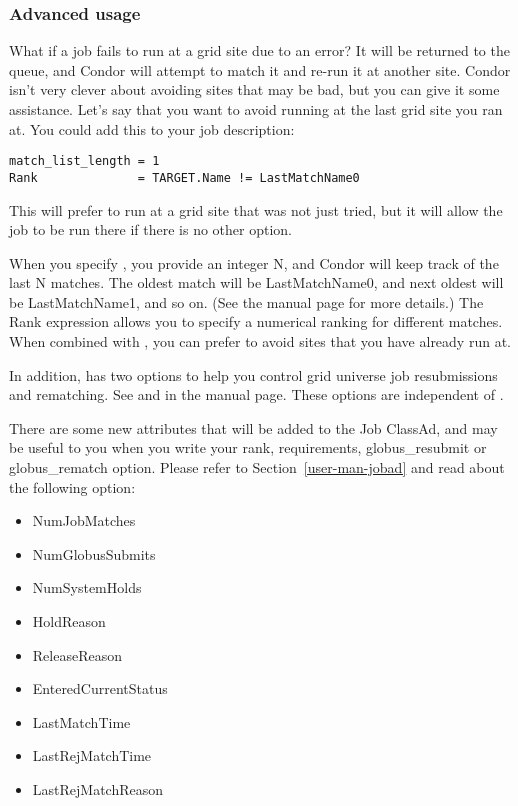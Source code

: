 \subsubsection{Advanced usage}

What if a job fails to run at a grid site due to an error? It will be
returned to the queue, and Condor will attempt to match it and
re-run it at another site. Condor isn't very clever about avoiding
sites that may be bad, but you can give it some assistance. Let's say
that you want to avoid running at the last grid site you ran at. You
could add this to your job description:

\footnotesize
\begin{verbatim}
match_list_length = 1
Rank              = TARGET.Name != LastMatchName0
\end{verbatim}
\normalsize

This will prefer to run at a grid site that was not just tried, but it
will allow the job to be run there if there is no other option. 

When you specify , you provide an integer N, and
Condor will keep track of the last N matches. The oldest match will be
LastMatchName0, and next oldest will be LastMatchName1, and so on. (See
the  manual page for more details.) The Rank expression
allows you to specify a numerical ranking for different matches. When
combined with , you can prefer to avoid sites that
you have already run at. 

In addition,  has two options to help you control
grid universe job resubmissions and rematching.  See  and
 in the  manual page.
These options are independent of .

There are some new attributes that will be added to the Job ClassAd,
and may be useful to you when you write your rank, requirements,
globus\_resubmit or globus\_rematch option. Please refer to
Section~\ref{user-man-jobad} and read about the following option:

\begin{itemize}
\item NumJobMatches
\item NumGlobusSubmits
\item NumSystemHolds
\item HoldReason
\item ReleaseReason
\item EnteredCurrentStatus
\item LastMatchTime
\item LastRejMatchTime
\item LastRejMatchReason
\end{itemize}

